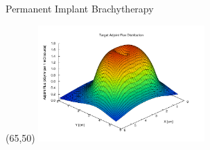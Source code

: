 \documentclass{beamer}
\begin{document}
\begin{frame}{Permanent Implant Brachytherapy}
  \begin{textblock}{20}(65,50)
    \includegraphics[width=2.5in]{figures/Target_adjoint_flux-midplane.pdf}
  \end{textblock}

\end{frame}

\end{document}
